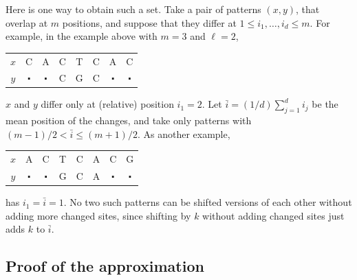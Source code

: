 \documentclass{article}
\theoremstyle{plain}
\theoremstyle{definition}
\begin{document}
Here is one way to obtain such a set.
Take a pair of patterns $(x,y)$, that overlap at $m$ positions,
and suppose that they differ at $1 \le i_1, \ldots, i_d \le m$.
For example, in the example above with $m=3$ and $\ell=2$,
\begin{center}
\begin{tabular}{c|ccccccc}
 $x$ &  C  & A & C & T & C & A & C \\
 $y$ &  $\centerdot$  & $\centerdot$  & C & G & C & $\centerdot$  & $\centerdot$
\end{tabular}
\end{center}
$x$ and $y$ differ only at (relative) position $i_1=2$.
Let $\bar i = (1/d) \sum_{j=1}^d i_j$ be the mean position of the changes,
and take only patterns with $(m-1)/2 < \bar i \le (m+1)/2$.
As another example,
\begin{center}
\begin{tabular}{c|ccccccc}
 $x$ &  A & C & T & C & A & C & G \\
 $y$ &  $\centerdot$  & $\centerdot$  & G & C & A & $\centerdot$  & $\centerdot$
\end{tabular}
\end{center}
has $i_1 = \bar i = 1$.
No two such patterns can be shifted versions of each other
without adding more changed sites,
since shifting by $k$ without adding changed sites just adds $k$ to $\bar i$.



\subsection*{Proof of the approximation}
\end{document}
